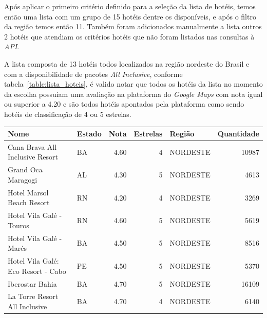 Após aplicar o primeiro critério definido para a seleção da lista de hotéis, temos então uma lista com um grupo de 15 hotéis dentre os disponíveis, e após o filtro da região temos então 11. Também foram adicionados manualmente a lista outros 2 hotéis que atendiam os critérios hotéis que não foram listados nas consultas à \textit{API}.

A lista composta de 13 hotéis todos localizados na região nordeste do Brasil e com a disponibilidade de pacotes \textit{All Inclusive}, conforme tabela~\ref{table:lista_hoteis}, é valido notar que todos os hotéis da lista no momento da escolha possuíam uma avaliação na plataforma do \textit{Google Maps} com nota igual ou superior a 4.20 e são todos hotéis apontados pela plataforma como sendo hotéis de classificação de 4 ou 5 estrelas.

\begin{table}[]
	\begin{tabular}{|p{5cm}|l|r|r|l|r|}
		\hline
		\textbf{Nome}                                 & \textbf{Estado} & \textbf{Nota} & \textbf{Estrelas} & \textbf{Região} & \textbf{Quantidade} \\\hline
		Cana Brava All Inclusive Resort               & BA              & 4.60          & 4                 & NORDESTE        & 10987               \\\hline
		Grand Oca Maragogi                            & AL              & 4.30          & 5                 & NORDESTE        & 4613                \\\hline
		Hotel Marsol Beach Resort                     & RN              & 4.20          & 4                 & NORDESTE        & 3269                \\\hline
		Hotel Vila Galé - Touros                      & RN              & 4.60          & 5                 & NORDESTE        & 5619                \\\hline
		Hotel Vila Galé - Marés                       & BA              & 4.50          & 5                 & NORDESTE        & 8516                \\\hline
		Hotel Vila Galé: Eco Resort - Cabo            & PE              & 4.50          & 5                 & NORDESTE        & 5370                \\\hline
		Iberostar Bahia                               & BA              & 4.70          & 5                 & NORDESTE        & 16109               \\\hline
		La Torre Resort All Inclusive                 & BA              & 4.70          & 4                 & NORDESTE        & 6140                \\\hline

\end{tabular}
\end{table}

